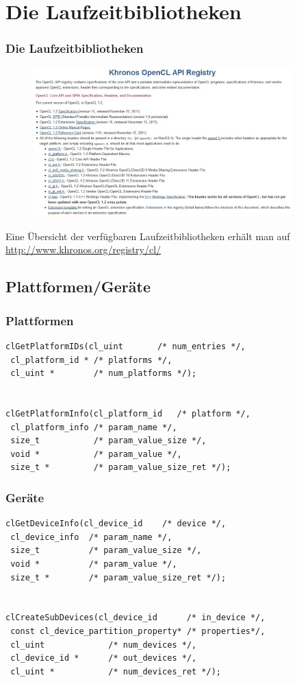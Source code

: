 \documentclass{beamer}
\begin{document}
\section{Die Laufzeitbibliotheken}
\begin{frame}[fragile]
\frametitle{Die Laufzeitbibliotheken}
\begin{figure}
\begin{center}
\includegraphics[width=10cm]{Khronos_API_page.jpg}
\end{center}
\end{figure}
Eine Übersicht der verfügbaren Laufzeitbibliotheken erhält man auf
\url{http://www.khronos.org/registry/cl/}
\end{frame}

\subsection{Plattformen/Geräte}
\begin{frame}[fragile]
\frametitle{Plattformen}
\begin{lstlisting}
clGetPlatformIDs(cl_uint       /* num_entries */,
 cl_platform_id * /* platforms */,
 cl_uint *        /* num_platforms */);


clGetPlatformInfo(cl_platform_id   /* platform */, 
 cl_platform_info /* param_name */,
 size_t           /* param_value_size */, 
 void *           /* param_value */,
 size_t *         /* param_value_size_ret */);
\end{lstlisting}
\end{frame}

\begin{frame}[fragile]
\frametitle{Geräte}
\begin{lstlisting}
clGetDeviceInfo(cl_device_id    /* device */,
 cl_device_info  /* param_name */, 
 size_t          /* param_value_size */, 
 void *          /* param_value */,
 size_t *        /* param_value_size_ret */);


clCreateSubDevices(cl_device_id      /* in_device */,
 const cl_device_partition_property* /* properties*/,
 cl_uint             /* num_devices */,
 cl_device_id *      /* out_devices */,
 cl_uint *           /* num_devices_ret */);
\end{lstlisting}
\end{frame}
\end{document}
